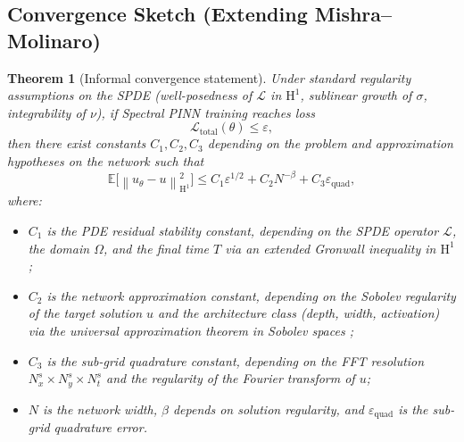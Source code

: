 \documentclass[times,12pt]{elsarticle}
\newcommand{\bbE}{\mathbb{E}}
\newcommand{\norm}[1]{\left\|#1\right\|}
\newcommand{\Sobolev}[1]{\mathrm{H}^{#1}}
\newtheorem{theorem}{Theorem}[section]
\begin{document}

\subsection{Convergence Sketch (Extending Mishra--Molinaro)}

\begin{theorem}[Informal convergence statement]
\label{thm:convergence-informal}
Under standard regularity assumptions on the SPDE (well-posedness of $\mathcal{L}$ in $\Sobolev{1}$, sublinear growth of $\sigma$, integrability of $\nu$), if Spectral PINN training reaches loss
\[
\mathcal{L}_{\text{total}}(\theta) \leq \varepsilon,
\]
then there exist constants $C_1, C_2, C_3$ depending on the problem and approximation hypotheses on the network such that
\begin{equation}
\bbE\big[\norm{u_\theta - u}^2_{\Sobolev{1}}\big] \leq C_1 \varepsilon^{1/2} + C_2 N^{-\beta} + C_3 \varepsilon_{\text{quad}},
\label{eq:convergence-bound}
\end{equation}
where:
\begin{itemize}
    \item $C_1$ is the PDE residual stability constant, depending on the SPDE operator $\mathcal{L}$, the domain $\Omega$, and the final time $T$ via an extended Gronwall inequality in $\Sobolev{1}$;
    \item $C_2$ is the network approximation constant, depending on the Sobolev regularity of the target solution $u$ and the architecture class (depth, width, activation) via the universal approximation theorem in Sobolev spaces \cite{Pinkus1999};
    \item $C_3$ is the sub-grid quadrature constant, depending on the FFT resolution $N_x^s \times N_y^s \times N_t^s$ and the regularity of the Fourier transform of $u$;
    \item $N$ is the network width, $\beta$ depends on solution regularity, and $\varepsilon_{\text{quad}}$ is the sub-grid quadrature error.
\end{itemize}
\end{theorem}
\end{document}
